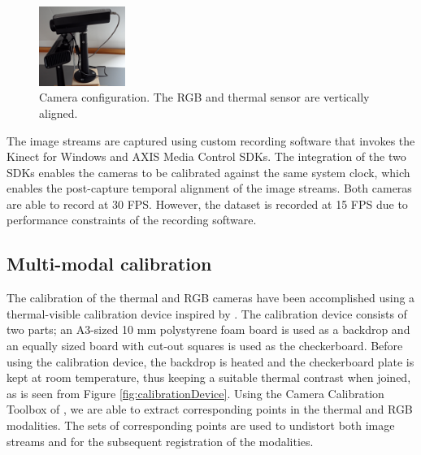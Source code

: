 \documentclass[10pt,twocolumn,letterpaper]{article}
\begin{document}
\begin{figure}[htpb]
	\centering
		\includegraphics[width=0.25\textwidth]{pictures/camerasetup.jpg}
	\caption{Camera configuration. The RGB and thermal sensor are vertically aligned.}
	\label{fig:camerasetup}
\end{figure}

The image streams are captured using custom recording software that invokes the Kinect for Windows and AXIS Media Control SDKs. The integration of the two SDKs enables the cameras to be calibrated against the same system clock, which enables the post-capture temporal alignment of the image streams. Both cameras are able to record at 30 FPS. However, the dataset is recorded at 15 FPS due to performance constraints of the recording software. 

\subsection{Multi-modal calibration}
The calibration of the thermal and RGB cameras have been accomplished using a thermal-visible calibration device inspired by \cite{vidas2012mask}. The calibration device consists of two parts; an A3-sized 10 mm polystyrene foam board is used as a backdrop and an equally sized board with cut-out squares is used as the checkerboard. Before using the calibration device, the backdrop is heated and the checkerboard plate is kept at room temperature, thus keeping a suitable thermal contrast when joined, as is seen from Figure \ref{fig:calibrationDevice}. %
Using the Camera Calibration Toolbox of \cite{bouguet2004camera}, we are able to extract corresponding points in the thermal and RGB modalities. The sets of corresponding points are used to undistort both image streams and for the subsequent registration of the modalities. 
\end{document}
